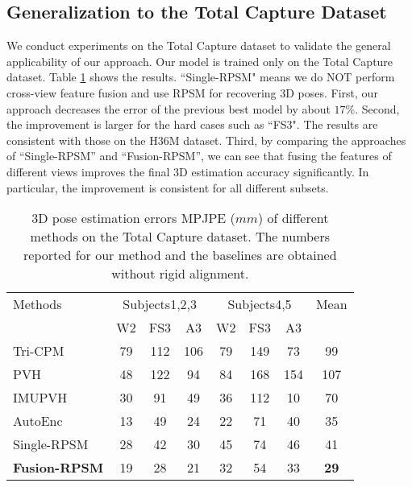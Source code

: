 \documentclass[10pt,twocolumn,letterpaper]{article}
\begin{document}
\subsection{Generalization to the Total Capture Dataset}
We conduct experiments on the Total Capture dataset to validate the general applicability of our approach. Our model is trained only on the Total Capture dataset. Table \ref{table:totalcapture} shows the results. ``Single-RPSM" means we do NOT perform cross-view feature fusion and use RPSM for recovering 3D poses. 
 First, our approach decreases the error of the previous best model \cite{trumble2018deep} by about $17\%$. Second, the improvement is larger for the hard cases such as ``FS3". The results are consistent with those on the H36M dataset. Third, by comparing the approaches of ``Single-RPSM'' and ``Fusion-RPSM'', we can see that fusing the features of different views improves the final $3$D estimation accuracy significantly. In particular, the improvement is consistent for all different subsets.

\begin{table}[]
\center
\small
\caption{$3$D pose estimation errors MPJPE ($mm$) of different methods on the Total Capture dataset. The numbers reported for our method and the baselines are obtained without rigid alignment.}
\label{table:totalcapture}
\scriptsize{
\begin{tabular}{l c c c  c c c c}
\toprule
Methods & \multicolumn{3}{c}{Subjects1,2,3} & \multicolumn{3}{c}{Subjects4,5} & Mean\\
& W2 & FS3 & A3 & W2 & FS3 & A3 &  \\
\hline
Tri-CPM \cite{wei2016convolutional} & 79 & 112 & 106 & 79 & 149 & 73 & 99\\
PVH \cite{trumble2017total} & 48 & 122 & 94 & 84 & 168 & 154 & 107 \\
IMUPVH \cite{trumble2017total} & 30 & 91 & 49 & 36 & 112 & 10 & 70\\
AutoEnc \cite{trumble2018deep} & 13 & 49 & 24 & 22 & 71 & 40 & 35 \\
\hline
Single-RPSM & 28 &	42 & 30 & 45 & 74 & 46 & 41\\
\textbf{Fusion-RPSM} & 19 &	28 & 21 & 32 & 54 & 33 & \textbf{29}\\
\toprule
\end{tabular}
}
\end{table}
\end{document}
